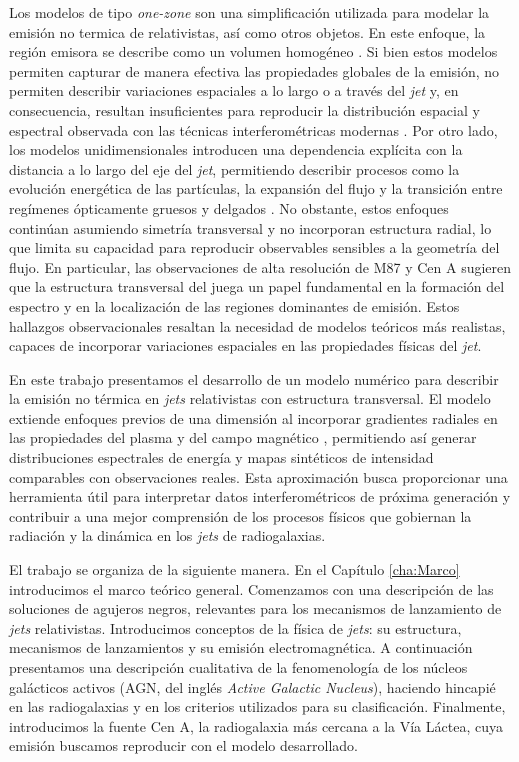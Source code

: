 	Los modelos de tipo \textit{one-zone} son una simplificaci\'on utilizada para modelar la emisi\'on no termica de \jets relativistas, así como otros objetos.
	En este enfoque, la regi\'on emisora se describe como un volumen homog\'eneo \citep[e.g.,][]{Ghisellini1998,Bottcher2013}.
	Si bien estos modelos permiten capturar de manera efectiva las propiedades globales de la emisión, no permiten describir variaciones espaciales a lo largo o a través del \textit{jet} y, en consecuencia, resultan insuficientes para reproducir la distribución espacial y espectral observada con las técnicas interferométricas modernas \citep{EHT_MW_2021, Lucchini_etal2022}.
	Por otro lado, los modelos unidimensionales introducen una dependencia explícita con la distancia a lo largo del eje del \textit{jet}, permitiendo describir procesos como la evolución energética de las partículas, la expansión del flujo y la transición entre regímenes ópticamente gruesos y delgados \citep[e.g.,][]{Blandford1979}. No obstante, estos enfoques continúan asumiendo simetría transversal y no incorporan estructura radial, lo que limita su capacidad para reproducir observables sensibles a la geometría del flujo.
	En particular, las observaciones de alta resolución de M87 y Cen A sugieren que la estructura transversal del \jet juega un papel fundamental en la formación del espectro y en la localización de las regiones dominantes de emisión.
	Estos hallazgos observacionales resaltan la necesidad de modelos teóricos más realistas, capaces de incorporar variaciones espaciales en las propiedades físicas del \textit{jet}.


	En este trabajo presentamos el desarrollo de un modelo numérico para describir la emisión no térmica en \textit{jets} relativistas con estructura transversal.
	El modelo extiende enfoques previos de una dimensión al incorporar gradientes radiales en las propiedades del plasma y del campo magnético \citep{Gutierrez2026}, permitiendo así generar distribuciones espectrales de energía y mapas sintéticos de intensidad comparables con observaciones reales.
	Esta aproximación busca proporcionar una herramienta útil para interpretar datos interferométricos de próxima generación y contribuir a una mejor comprensión de los procesos físicos que gobiernan la radiación y la dinámica en los \textit{jets} de radiogalaxias.

	El trabajo se organiza de la siguiente manera.
	En el Capítulo \ref{cha:Marco} introducimos el marco teórico general.
	Comenzamos con una descripción de las soluciones de agujeros negros, relevantes para los mecanismos de lanzamiento de \textit{jets} relativistas.
	Introducimos conceptos de la física de \textit{jets}: su estructura, mecanismos de lanzamientos y su emisión electromagnética.
	A continuación presentamos una descripción cualitativa de la fenomenología de los núcleos galácticos activos (AGN, del inglés \textit{Active Galactic Nucleus}), haciendo hincapié en las radiogalaxias y en los criterios utilizados para su clasificación.
	Finalmente, introducimos la fuente Cen A, la radiogalaxia más cercana a la Vía Láctea, cuya emisión buscamos reproducir con el modelo desarrollado.

